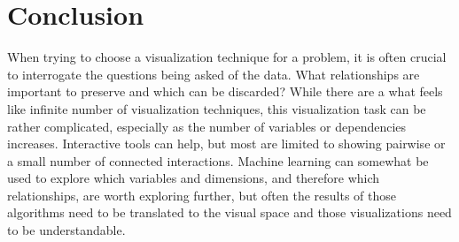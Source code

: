 \documentclass[letterpaper,onecolumn,titlepage]{Ythesis}
\begin{document}
\section{Conclusion}
\label{sec:conclusion}
When trying to choose a visualization technique for a problem, it is often
crucial to interrogate the questions being asked of the data. What
relationships are important to preserve and which can be discarded? While there
are a what feels like infinite number of visualization techniques, this
visualization task can be rather complicated, especially as the number of
variables or dependencies increases. Interactive tools can help, but most are limited to showing pairwise or a small number of connected interactions. Machine learning can somewhat be used
to explore which variables and dimensions, and therefore which relationships, are worth
exploring further, but often the results of those algorithms need to
be translated to the visual space and those visualizations need to be
understandable. 


\printbibliography
\end{document}
